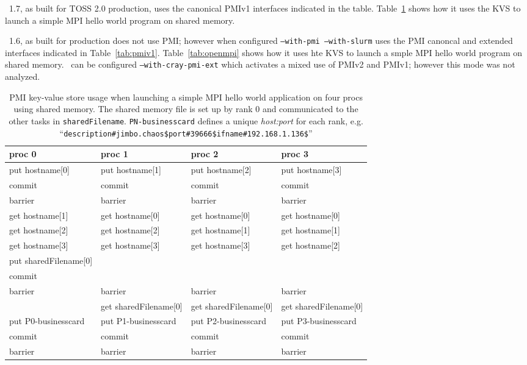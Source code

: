 \ 1.7, as built for TOSS 2.0 production, uses the canonical
PMIv1 interfaces indicated in the table.
Table~\ref{tab:mvapich} shows how it uses the KVS to launch a simple MPI
hello world program on shared memory.

\openmpi\ 1.6, as built for production does not use PMI;
however when configured {\tt --with-pmi --with-slurm} uses the 
PMI canoncal and extended interfaces indicated in Table~\ref{tab:pmiv1}.
Table~\ref{tab:openmpi} shows how it uses hte KVS to launch a smple MPI
hello world program on shared memory.
\openmpi\ can be configured {\tt --with-cray-pmi-ext} which
activates a mixed use of PMIv2 and PMIv1; however this mode was not analyzed.

\begin{table}
\centering
\begin{tabular}{|p{4cm}|p{4cm}|p{4cm}|p{4cm}|}\hline
\textbf{proc 0} &       \textbf{proc 1} &   \textbf{proc 2} &    \textbf{proc 3}\\
\hline
put hostname[0] &     put hostname[1] &     put hostname[2] &     put hostname[3]\\
commit &              commit &              commit  &             commit\\
barrier &             barrier &             barrier &             barrier\\
\hline
get hostname[1] &     get hostname[0] &     get hostname[0] &     get hostname[0]\\
get hostname[2] &     get hostname[2] &     get hostname[1] &     get hostname[1]\\
get hostname[3] &     get hostname[3] &     get hostname[3] &     get hostname[2]\\
put sharedFilename[0] & & & \\
commit  & & &\\
barrier& barrier & barrier & barrier\\
\hline
 &                     get sharedFilename[0]&get sharedFilename[0]&get sharedFilename[0]\\
put P0-businesscard & put P1-businesscard & put P2-businesscard & put P3-businesscard\\
commit &              commit &              commit &              commit\\
barrier &             barrier &             barrier &             barrier\\
\hline
\end{tabular}
\caption{ PMI key-value store usage when launching a simple 
MPI hello world application on four procs using shared memory.
The shared memory file
is set up by rank 0 and communicated to the other tasks in {\tt sharedFilename}.
{\tt PN-businesscard} defines a unique {\em host:port} for each rank, e.g.
``{\tt description\#jimbo.chaos\$port\#39666\$ifname\#192.168.1.136\$}''}
\label{tab:mvapich}
\end{table}

